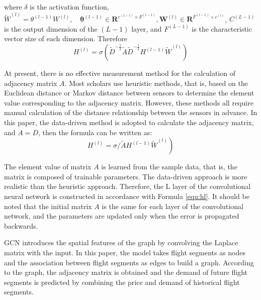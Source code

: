 \documentclass[journal,article,submit,moreauthors,pdftex]{Definitions/mdpi}
\begin{document}
where $\delta$ is the activation function, $\widetilde{W}^{(l)}=\theta^{(l-1)} W^{(l)}, \quad \boldsymbol{\theta}^{(l-1)} \in \boldsymbol{R}^{c^{(1-l)} \times F^{(l-1)}}, \boldsymbol{W}^{(l)} \in \boldsymbol{R}^{F^{(l-1)} \times c^{(l)}}$,  $C^{(L-1)}$ is the output dimension of the $(L-1)$ layer, and $F^{(L-1)}$ is the characteristic vector size of each dimension. Therefore
\begin{equation}
    H^{(l)}=\sigma\left(\widetilde{D}^{-\frac{1}{2}} \widetilde{A} \widetilde{D}^{-\frac{1}{2}} H^{(l-1)} \widetilde{W}^{(l)}\right)
\end{equation}
\par At present, there is no effective measurement method for the calculation of adjacency matrix $A$. Most scholars use heuristic methods, that is, based on the Euclidean distance or Markov distance between sensors to determine the element value corresponding to the adjacency matrix. However, these methods all require manual calculation of the distance relationship between the sensors in advance. In this paper, the data-driven method is adopted to calculate the adjacency matrix, and $A = D$, then the formula can be written as:
\begin{equation}
    \left.H^{(l)}=\sigma / \widetilde{A} H^{(l-1)} \widetilde{W}^{(l)}\right)
    \label{equ:hl}
\end{equation}
\par The element value of matrix $A$ is learned from the sample data, that is, the matrix is composed of trainable parameters. The data-driven approach is more realistic than the heuristic approach. Therefore, the L layer of the convolutional neural network is constructed in accordance with Formula \ref{equ:hl}. It should be noted that the initial matrix $A$ is the same for each layer of the convolutional network, and the parameters are updated only when the error is propagated backwards.
\par GCN introduces the spatial features of the graph by convolving the Laplace matrix with the input. In this paper, the model takes flight segments as nodes and the association between flight segments as edges to build a graph. According to the graph, the adjacency matrix is obtained and the demand of future flight segments is predicted by combining the price and demand of historical flight segments.
\end{document}
